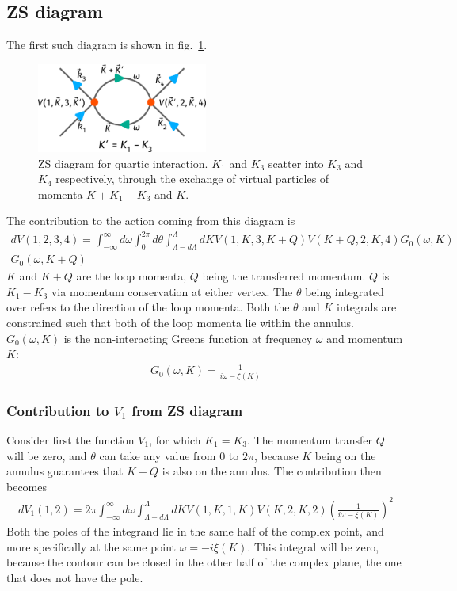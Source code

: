 \documentclass[12pt]{article}
\begin{document}
\subsection{ZS diagram}
The first such diagram is shown in fig.~\ref{loop11}.
\begin{figure}[!htpb]
\centering
\includegraphics[width=0.5\textwidth]{./figures/term3.pdf}
\caption{ZS diagram for quartic interaction. \(K_1\) and \(K_3\) scatter into \(K_3\) and \(K_4\) respectively, through the exchange of virtual particles of momenta \(K + K_1 - K_3\) and \(K\).}
\label{loop11}
\end{figure}
The contribution to the action coming from this diagram is
\begin{equation}\begin{aligned}
	dV(1,2,3,4) = \int_{-\infty}^\infty d\omega  \int_0^{2\pi} d\theta \int_{\Lambda - d\Lambda}^\Lambda dK V(1,K,3,K+Q) V(K+Q, 2, K, 4) G_0(\omega, K)\\
	G_0(\omega, K+Q)
\end{aligned}\end{equation}
\(K\) and \(K+Q\) are the loop momenta, \(Q\) being the transferred momentum. \(Q\) is \(K_1 - K_3\) via momentum conservation at either vertex. The \(\theta\) being integrated over refers to the direction of the loop momenta. Both the \(\theta\) and \(K\) integrals are constrained such that both of the loop momenta lie within the annulus. \(G_0(\omega,K)\) is the non-interacting Greens function at frequency \(\omega\) and momentum \(K\):
\begin{equation}\begin{aligned}
	G_0(\omega,K) = \frac{1}{i\omega - \xi(K)}
\end{aligned}\end{equation}
\subsubsection{Contribution to \(V_1\) from ZS diagram}
Consider first the function \(V_1\), for which \(K_1=K_3\). The momentum transfer \(Q\) will be zero, and \(\theta\) can take any value from \(0\) to \(2\pi\), because \(K\) being on the annulus guarantees that \(K+Q\) is also on the annulus. The contribution then becomes
\begin{equation}\begin{aligned}
	dV_1(1,2) = 2\pi \int_{-\infty}^\infty d\omega \int_{\Lambda - d\Lambda}^\Lambda dK V(1,K,1,K) V(K, 2, K, 2) \left(\frac{1}{i\omega - \xi(K)}\right)^2
\end{aligned}\end{equation}
Both the poles of the integrand lie in the same half of the complex point, and more specifically at the same point \(\omega = -i\xi(K)\). This integral will be zero, because the contour can be closed in the other half of the complex plane, the one that does not have the pole.
\end{document}
